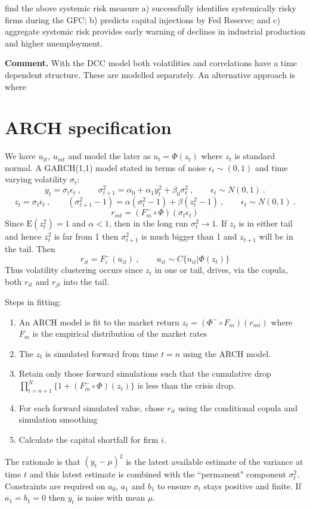 \documentclass[authoryear]{elsarticle}
\newcommand{\E}{\mathrm{E}}
\newcommand{\eps}{\epsilon}
\renewcommand{\i}{\item}
\newcommand{\cq}{\ , \qquad}
\newcommand{\be}[1]{\begin{equation}\label{#1}}
\newcommand{\ee}{\end{equation}}
\begin{document}
\cite{brownlees2015} find the above systemic risk measure  a)  successfully identifies systemically risky firms during the GFC;
b)  predicts capital injections by Fed Reserve; and c) aggregate systemic risk provides early warning of declines in industrial production and higher unemployment.

{\bf Comment.}  With the DCC model both volatilities and correlations have a time dependent structure.  These are modelled separately.
An alternative approach is where 

\section{ARCH specification}

We have $u_{it}$, $u_{mt}$ and model the later as
$u_{t} = \Phi(z_t)$ where $z_t$ is standard normal.   A GARCH(1,1) model stated in terms of noise $\eps_t\sim(0,1)$ and time varying volatility $\sigma_t$:
$$
y_t=  \sigma_t\eps_t\cq \sigma^2_{t+1} = \alpha_0+\alpha_1y^2_{t}+ \beta_0 \sigma_t^2\cq \eps_t\sim N(0,1)\ .
$$
\begin{equation}\label{garch}
z_t=  \sigma_t\eps_t\cq (\sigma^2_{t+1}-1) = \alpha (\sigma^2_{t}-1) + \beta(z_t^2-1)\cq \eps_t\sim N(0,1)\ .
\end{equation}
$$
r_{mt}=(F_m^-\circ\Phi)(\sigma_t\eps_t)
$$
Since $\E(z_t^2)=1$ and $\alpha<1$, then in the long run $\sigma^2_t\rightarrow 1$.   If $z_t$ is in either tail and hence $z_t^2$ is far from  1 then $\sigma^2_{t+1}$ is much bigger than 1 and $z_{t+1}$ will be in the tail.   Then
\be{forward}
r_{it}=F_i^-(u_{it})\cq u_{it}\sim C\{u_{it}|\Phi(z_t)\}
\ee
Thus volatility clustering occurs since $z_t$ in one or tail, drives, via the copula, both $r_{it}$ and $r_{jt}$ into the tail.      

Steps in fitting:
\begin{enumerate}
\i  An ARCH model is fit to the market return $z_t=(\Phi^-\circ F_m)(r_{mt})$ where $F_m$ is the empirical distribution of the market rates
\i  The $z_t$ is simulated forward from time $t=n$ using the ARCH model. 
\i  Retain only those forward simulations such that the cumulative drop $\prod_{t=n+1}^N\{1+(F_m^-\circ \Phi)(z_t)\}$ is less than the crisis drop.
\i  For each forward simulated value, chose $r_{it}$ using the conditional copula and simulation smoothing
\i Calculate the capital shortfall for firm $i$.
\end{enumerate}

   
The rationale is that  $(y_{t}-\mu)^2$ is the latest available estimate of the variance at time $t$ and this latest   estimate is combined with the  ``permanent" component $\sigma^2_{t}$.   Constraints  are required on $a_0$, $a_1$ and $b_1$ to ensure $\sigma_t$ stays positive and finite.  If  $a_1=b_1=0$ then $y_t$ is noise with mean $\mu$. 
\end{document}
